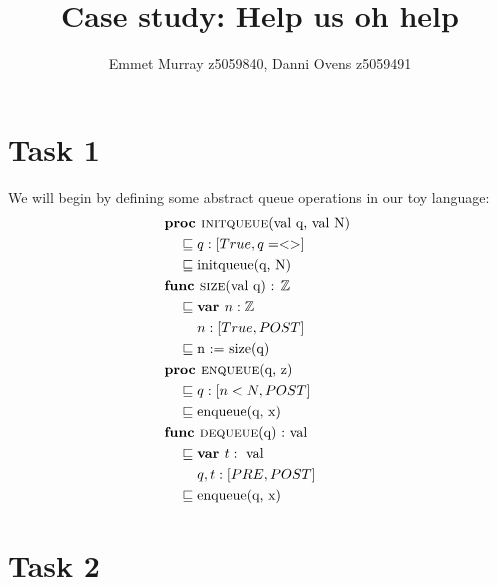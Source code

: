 \documentclass[a4paper]{scrartcl}
\title{Case study: Help us oh help}
\author{Emmet Murray z5059840, Danni Ovens z5059491}
\newcommand{\Z}{\mathbb{Z}}
\newcommand{\refinedby}{\sqsubseteq} %
\begin{document}
\maketitle
\section*{Task 1}
We will begin by defining some abstract queue operations in our toy language:
\begin{align*}
& \textbf{proc }\text{\textsc{initqueue}(val q, val N) } \\ 
    &\quad \refinedby  q : [True, q = <> ] \\
    & \quad \refinedby \text{initqueue(q, N)} \\
& \textbf{func }\text{\textsc{size}(val q) : }\Z \\
    & \quad \refinedby \textbf{var }n : \Z \\
    & \quad \quad ~ n : [True, POST] \\
    & \quad \refinedby \text{n := size(q)} \\
& \textbf{proc }\text{\textsc{enqueue}(q, z) }\\
    & \quad \refinedby q : [n < N,  POST] \\
    & \quad \refinedby \text{enqueue(q, x)} \\
& \textbf{func }\text{\textsc{dequeue}(q) :} \text{ val}\\
    & \quad \refinedby \textbf{var }t : \text{ val} \\
    & \quad \quad ~ q, t : [PRE,  POST] \\
    & \quad \refinedby \text{enqueue(q, x)} \\
\end{align*}

\section*{Task 2}
\end{document}
